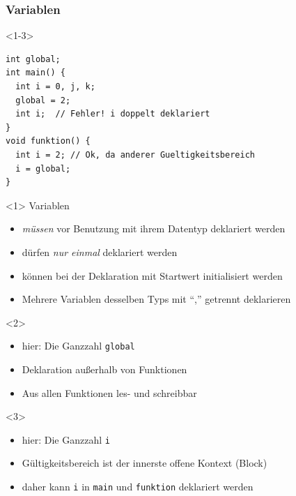 \documentclass{slides}
\begin{document}
\begin{frame}[fragile]
  \frametitle{Variablen}


\begin{onlyenv}<1-3>
\begin{lstlisting}
int global;
int main() {
  int i = 0, j, k;
  global = 2;
  int i;  // Fehler! i doppelt deklariert
}
void funktion() {
  int i = 2; // Ok, da anderer Gueltigkeitsbereich
  i = global;
}
\end{lstlisting}
\end{onlyenv}

  \begin{onlyenv}<1>
    \alert{Variablen}
    \begin{itemize}
    \item \emph{müssen} vor Benutzung mit ihrem Datentyp \alert{deklariert} werden
    \item dürfen \emph{nur einmal} deklariert werden
    \item können bei der Deklaration mit Startwert \alert{initialisiert} werden
    \item Mehrere Variablen desselben Typs mit "`,"' getrennt deklarieren
    \end{itemize}
  \end{onlyenv}

  \begin{onlyenv}<2>
    \begin{itemize}
    \item hier: Die Ganzzahl \lstinline!global!
    \item Deklaration außerhalb von Funktionen
    \item Aus allen Funktionen les- und schreibbar
    \end{itemize}
  \end{onlyenv}
  \begin{onlyenv}<3>
    \begin{itemize}
    \item hier: Die Ganzzahl \lstinline!i!
    \item Gültigkeitsbereich ist der innerste offene Kontext (Block)
    \item daher kann \lstinline!i! in \lstinline!main! und \lstinline!funktion!
      deklariert werden
    \end{itemize}
  \end{onlyenv}
\end{frame}
\end{document}
